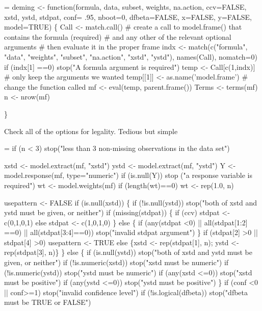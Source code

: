 \documentclass{article}
\begin{document}
\begin{nwchunk}
=
 deming <-  function(formula, data, subset, weights, na.action,
                    ccv=FALSE, xstd, ystd, stdpat,
                    conf= .95, nboot=0, dfbeta=FALSE,
                    x=FALSE, y=FALSE, model=TRUE) \{
     Call <- match.call()
     # create a call to model.frame() that contains the formula (required)
     #  and any other of the relevant optional arguments
     # then evaluate it in the proper frame
     indx <- match(c("formula", "data", "weights", "subset", "na.action",
                     "xstd", "ystd"),
                   names(Call), nomatch=0) 
     if (indx[1] ==0) stop("A formula argument is required")
     temp <- Call[c(1,indx)]  # only keep the arguments we wanted
     temp[[1]] <- as.name('model.frame')  # change the function called
     mf <- eval(temp, parent.frame())
     Terms <- terms(mf)
     n <- nrow(mf)
 
  \} 
 
     
     
\end{nwchunk}

Check all of the options for legality.  
Tedious but simple
\begin{nwchunk}
=
 if (n < 3) stop("less than 3 non-missing observations in the data set")
 
 xstd <- model.extract(mf, "xstd")
 ystd <- model.extract(mf, "ystd")
 Y <- model.response(mf, type="numeric")
 if (is.null(Y))
     stop ("a response variable is required")
 wt <- model.weights(mf)
 if (length(wt)==0) wt <- rep(1.0, n)
 
 usepattern <- FALSE
 if (is.null(xstd)) \{
     if (!is.null(ystd)) 
     stop("both of xstd and ystd must be given, or neither")
     if (missing(stdpat)) \{
         if (ccv) stdpat <- c(0,1,0,1)
         else     stdpat <- c(1,0,1,0)
     \}
     else \{
         if (any(stdpat <0) || all(stdpat[1:2] ==0) || all(stdpat[3:4]==0))
             stop("invalid stdpat argument")
     \}
     if (stdpat[2] >0 || stdpat[4] >0) usepattern <- TRUE
     else \{xstd <- rep(stdpat[1], n); ystd <- rep(stdpat[3], n)\}
 \} else  \{
     if (is.null(ystd))
         stop("both of xstd and ystd must be given, or neither")
     if (!is.numeric(xstd)) stop("xstd must be numeric")
     if (!is.numeric(ystd)) stop("ystd must be numeric")
     if (any(xstd <=0)) stop("xstd must be positive")
     if (any(ystd <=0)) stop("ystd must be positive")
 \}
 if (conf <0 || conf>=1) stop("invalid confidence level")
 if (!is.logical(dfbeta)) stop("dfbeta must be TRUE or FALSE")
\end{nwchunk}
\end{document}
